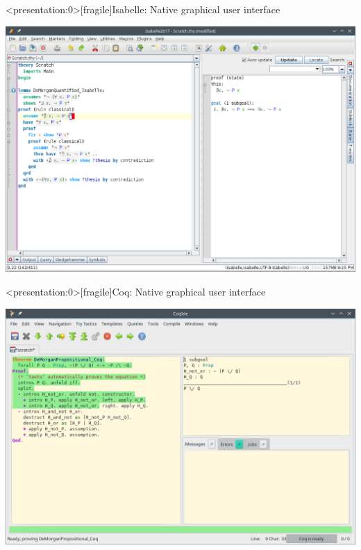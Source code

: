 \documentclass[aspectratio=169, 12pt, fleqn]{beamer}
\begin{document}
\begin{frame}<presentation:0>[fragile]{Isabelle: Native graphical user interface}
\begin{center}
  \includegraphics[scale=0.4]{img/isabelle_morgan.png}
\end{center}
\end{frame}
\begin{frame}<presentation:0>[fragile]{Coq: Native graphical user interface}
\begin{center}
  \includegraphics[scale=0.42]{img/coq_morgan.png}
\end{center}
\end{frame}
\end{document}
